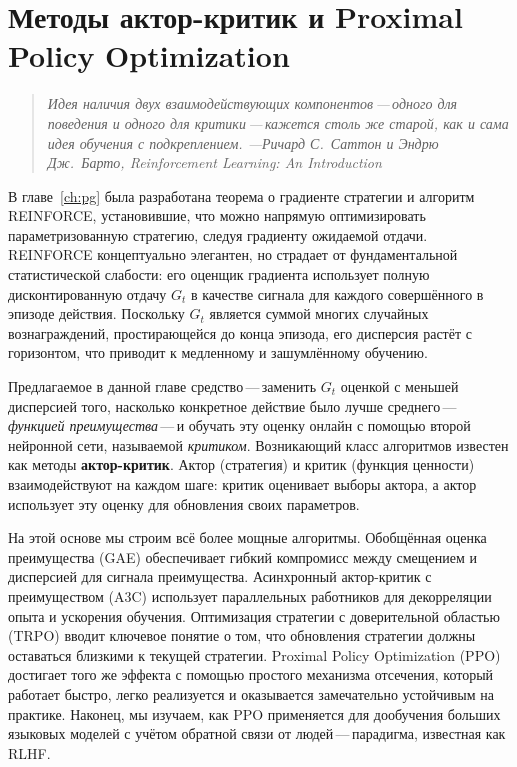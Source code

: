 \chapter[Методы актор-критик и PPO]{Методы актор-критик и Proximal Policy Optimization}
\label{ch:actor-critic}

\begin{quote}
\itshape
Идея наличия двух взаимодействующих компонентов\,---\,одного для поведения и одного для критики\,---\,кажется столь же старой, как и сама идея обучения с подкреплением.
\upshape\hfill---Ричард С.\ Саттон и Эндрю Дж.\ Барто, \textit{Reinforcement Learning: An Introduction}
\end{quote}

\bigskip

В главе~\ref{ch:pg} была разработана теорема о градиенте стратегии и алгоритм REINFORCE, установившие, что можно напрямую оптимизировать параметризованную стратегию, следуя градиенту ожидаемой отдачи. REINFORCE концептуально элегантен, но страдает от фундаментальной статистической слабости: его оценщик градиента использует полную дисконтированную отдачу $G_t$ в качестве сигнала для каждого совершённого в эпизоде действия. Поскольку $G_t$ является суммой многих случайных вознаграждений, простирающейся до конца эпизода, его дисперсия растёт с горизонтом, что приводит к медленному и зашумлённому обучению.

Предлагаемое в данной главе средство\,---\,заменить $G_t$ оценкой с меньшей дисперсией того, насколько конкретное действие было лучше среднего\,---\,\emph{функцией преимущества}\,---\,и обучать эту оценку онлайн с помощью второй нейронной сети, называемой \emph{критиком}. Возникающий класс алгоритмов известен как методы \textbf{актор-критик}.
Актор (стратегия) и критик (функция ценности) взаимодействуют на каждом шаге: критик оценивает выборы актора, а актор использует эту оценку для обновления своих параметров.

На этой основе мы строим всё более мощные алгоритмы. Обобщённая оценка преимущества (GAE) обеспечивает гибкий компромисс между смещением и дисперсией для сигнала преимущества. Асинхронный актор-критик с преимуществом (A3C) использует параллельных работников для декорреляции опыта и ускорения обучения. Оптимизация стратегии с доверительной областью (TRPO) вводит ключевое понятие о том, что обновления стратегии должны оставаться близкими к текущей стратегии. Proximal Policy Optimization (PPO) достигает того же эффекта с помощью простого механизма отсечения, который работает быстро, легко реализуется и оказывается замечательно устойчивым на практике. Наконец, мы изучаем, как PPO применяется для дообучения больших языковых моделей с учётом обратной связи от людей\,---\,парадигма, известная как RLHF.

